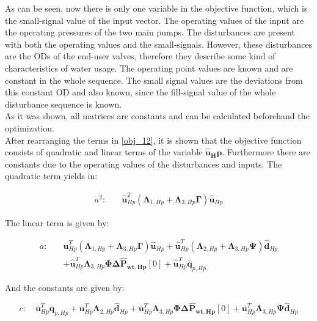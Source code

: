 As can be seen, now there is only one variable in the objective function, which is the small-signal value of the input vector. The operating values of the input are the operating pressures of the two main pumps. The disturbances are present with both the operating values and the small-signals. However, these disturbances are the ODs of the end-user valves, therefore they describe some kind of characteristics of water usage. The operating point values are known and are constant in the whole sequence. The small signal values are the deviations from this constant OD and also known, since the fill-signal value of the whole disturbance sequence is known.
\\
As it was shown, all matrices are constants and can be calculated beforehand the optimization. 
\\
After rearranging the terms in \eqref{obj_12}, it is shown that the objective function consists of quadratic and linear terms of the variable $\bm{\hat{u}_Hp}$. Furthermore there are constants due to the operating values of the disturbances and inputs. The quadratic term yields in:

\begin{equation}
  \begin{split}
    a^2  : \quad & \bm{\hat{u}}_{Hp}^{T}(\bm{\Lambda}_{1,Hp} + \bm{\Lambda}_{3,Hp} \bm{\Gamma} ) \bm{\hat{u}}_{Hp}
  \end{split}
\end{equation}

The linear term is given by: 

\begin{equation}
  \begin{split}
    a  : \quad & \bm{\bar{u}}_{Hp}^{T}(\bm{\Lambda}_{1,Hp} + \bm{\Lambda}_{3,Hp} \bm{\Gamma} ) \bm{\hat{u}}_{Hp} + \bm{\hat{u}}_{Hp}^{T}(\bm{\Lambda}_{2,Hp} + \bm{\Lambda}_{3,Hp} \bm{\Psi} ) \bm{\hat{d}}_{Hp}
    \\
    & + \bm{\hat{u}}_{Hp}^{T}\bm{\Lambda}_{3,Hp} \bm{\Phi} \bm{\Delta \hat{P}_{wt,Hp}}[0] + \bm{\hat{u}}_{Hp}^{T} \bm{\bar{q}}_{p,Hp}
  \end{split}
\end{equation}

And the constants are given by:

\begin{equation}
    c  : \quad \bm{\bar{u}}_{Hp}^{T}\bm{\bar{q}}_{p,Hp}  + \bm{\bar{u}}_{Hp}^{T}\bm{\Lambda}_{2,Hp}\bm{\hat{d}}_{Hp} + \bm{\bar{u}}_{Hp}^{T}\bm{\Lambda}_{3,Hp}\bm{\Phi} \bm{\Delta \hat{P}_{wt,Hp}}[0] + \bm{\bar{u}}_{Hp}^{T}\bm{\Lambda}_{3,Hp}\bm{\Psi}\bm{\hat{d}}_{Hp}
\end{equation}

